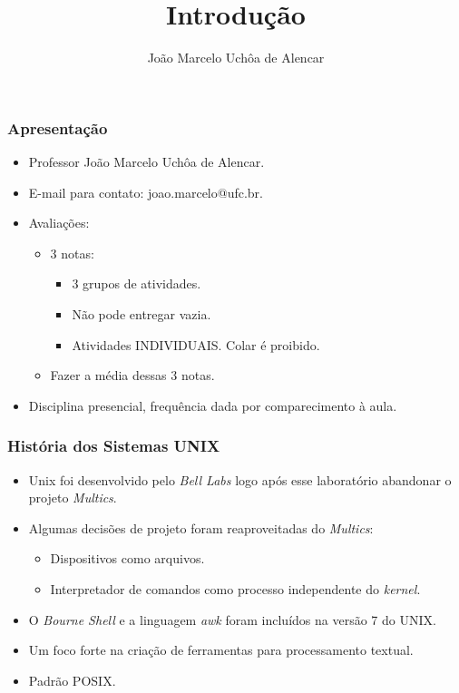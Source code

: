 \documentclass{beamer}
\title{Introdução}
\author[João Marcelo Uchôa de Alencar]{João Marcelo Uchôa de Alencar}
\institute{Universidade Federal do Ceará - Quixadá}
\begin{document}
   \begin{frame}
      \titlepage
   \end{frame}


\begin{frame}
   \frametitle{Apresentação}
   \begin{itemize}
      \item Professor João Marcelo Uchôa de Alencar.
      \item E-mail para contato: joao.marcelo@ufc.br.
      \item Avaliações:
      \begin{itemize}
         \item 3 notas: 
	      \begin{itemize}
            \item 3 grupos de atividades.
            \item Não pode entregar vazia.
            \item Atividades INDIVIDUAIS. Colar é proibido. 
         \end{itemize}
	      \item Fazer a média dessas 3 notas. 
      \end{itemize}
      \item Disciplina presencial, frequência dada por comparecimento à aula. 
   \end{itemize}
\end{frame}


\begin{frame}
   \frametitle{História dos Sistemas UNIX}
   \begin{itemize}
      \item Unix foi desenvolvido pelo \textit{Bell Labs} logo após esse laboratório abandonar o projeto \textit{Multics}.
      \item Algumas decisões de projeto foram reaproveitadas do \textit{Multics}:
      \begin{itemize}
         \item Dispositivos como arquivos.
	 \item Interpretador de comandos como processo independente do \textit{kernel}.
      \end{itemize}
      \item O \textit{Bourne Shell} e a linguagem \textit{awk} foram incluídos na versão 7 do UNIX.
      \item Um foco forte na criação de ferramentas para processamento textual.
      \item Padrão POSIX.
   \end{itemize}
\end{frame}
\end{document}
